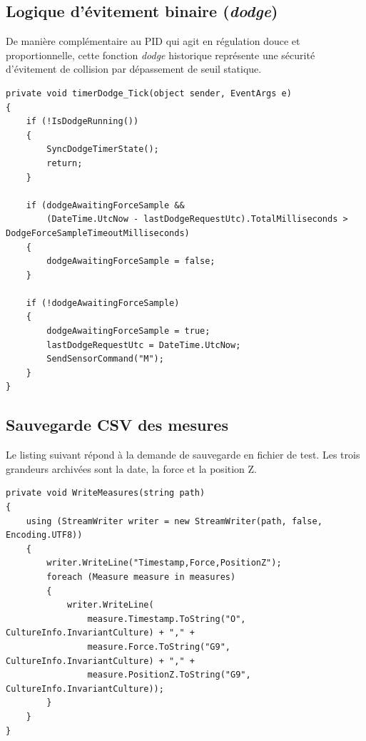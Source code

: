 \documentclass[11pt,a4paper]{article}
\begin{document}
\subsection{Logique d'\'evitement binaire (\emph{dodge})}
De mani\`ere compl\'ementaire au PID qui agit en r\'egulation douce et proportionnelle, cette fonction \emph{dodge} historique repr\'esente une s\'ecurit\'e d'\'evitement de collision par d\'epassement de seuil statique.
\begin{lstlisting}
private void timerDodge_Tick(object sender, EventArgs e)
{
    if (!IsDodgeRunning())
    {
        SyncDodgeTimerState();
        return;
    }

    if (dodgeAwaitingForceSample &&
        (DateTime.UtcNow - lastDodgeRequestUtc).TotalMilliseconds > DodgeForceSampleTimeoutMilliseconds)
    {
        dodgeAwaitingForceSample = false;
    }

    if (!dodgeAwaitingForceSample)
    {
        dodgeAwaitingForceSample = true;
        lastDodgeRequestUtc = DateTime.UtcNow;
        SendSensorCommand("M");
    }
}
\end{lstlisting}

\subsection{Sauvegarde CSV des mesures}
Le listing suivant r\'epond \`a la demande de sauvegarde en fichier de test. Les trois grandeurs archiv\'ees sont la date, la force et la position Z.
\begin{lstlisting}
private void WriteMeasures(string path)
{
    using (StreamWriter writer = new StreamWriter(path, false, Encoding.UTF8))
    {
        writer.WriteLine("Timestamp,Force,PositionZ");
        foreach (Measure measure in measures)
        {
            writer.WriteLine(
                measure.Timestamp.ToString("O", CultureInfo.InvariantCulture) + "," +
                measure.Force.ToString("G9", CultureInfo.InvariantCulture) + "," +
                measure.PositionZ.ToString("G9", CultureInfo.InvariantCulture));
        }
    }
}
\end{lstlisting}
\end{document}
